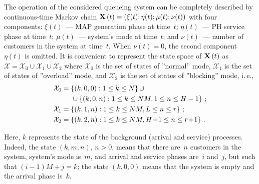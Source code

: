 \begin{multicols}{2}
The operation of the considered queueing
system can be completely described
by continuous-time Markov chain 
${\bf{X}} \left( t \right)= {\left( \xi (t); \eta(t); \mu(t); \nu(t) \right) }$ with
four components:
$\xi(t)$~--- MAP generation phase at time~$t$;
$\eta(t)$~--- PH service phase at time~$t$;
$\mu(t)$~--- system's mode at time~$t$;
and $\nu(t)$~--- number of customers in
the system at time~$t$.
When $\nu(t)=0$, the second component $\eta(t)$ is omitted.
It is convenient to represent the state space of ${\bf{X}} \left( t \right)$ as
$\mathcal{X} = {\mathcal{X}_0} \cup {\mathcal{X}_1} \cup {\mathcal{X}_2}$
where $\mathcal{X}_{0} $ is the set of states of ''normal'' mode,
$\mathcal{X}_{1} $ is the set of states of ''overload'' mode,
and $\mathcal{X}_{2}$ is the set of states of ''blocking'' mode, i.\,e.,
\begin{align*}
{\mathcal{X}_0} &= \left\{ \left( {k,0,0} \right):  1 \le k \le N  \right\}
\cup 
\\
&\hspace*{5mm}\cup \left\{ {\left( {k,0,n} \right):  1 \le k \le NM, 1 \le n \le H - 1} \right\}\,;\\
{\mathcal{X}_1} &= \left\{ {\left( {k,1,n}\right): 1 \le k \le NM,  L \le n \le r} \right\}\,;\\
{\mathcal{X}_2} &= \left\{ {\left( {k,2,n} \right): 1 \le k \le NM, 
H\! + \! 1 \le n \le r \! + \! 1} \right\}\,.
\end{align*}

\noindent
Here, $k$ represents the state of 
the background (arrival and service) processes.
Indeed, the state $(k,m,n)$, $n>0$, means that 
there are~$n$ customers in the system, system's mode is~$m$,
and arrival and service phases are~$i$ and~$j$, but such that
$(i-1)M+j=k$; the state $(k,0,0)$ means that the system
is empty and the arrival phase is~$k$.


\end{multicols}
